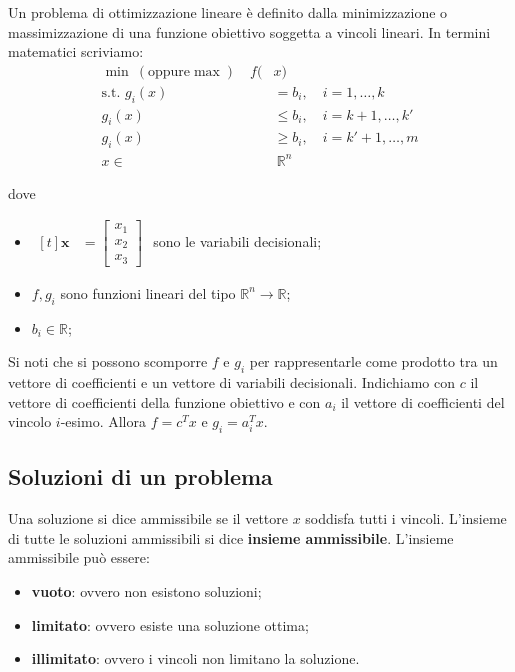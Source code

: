 \documentclass[12pt]{article}
\begin{document}
Un problema di ottimizzazione lineare è definito dalla minimizzazione o
massimizzazione di una funzione obiettivo soggetta a vincoli lineari. In termini
matematici scriviamo:
\begin{align*}
	\min \ (\text{oppure} \max) \quad f( & x)                                   \\
	\text{s.t. } g_i(x)                  & = b_i, \quad i = 1, \dots, k         \\
	g_i(x)                               & \leq b_i, \quad i = k + 1, \dots, k' \\
	g_i(x)                               & \geq b_i, \quad i = k' + 1, \dots, m \\
	x                    \in             & \ \mathbb{R}^n
\end{align*}

dove
\begin{itemize}
	\item $\begin{aligned}[t]
			      \mathbf{x} & = \begin{bmatrix}
				                     x_1 \\
				                     x_2 \\
				                     x_3
			                     \end{bmatrix}
		      \end{aligned}$
	      sono le variabili decisionali;
	\item $f, g_i$ sono funzioni lineari del tipo $\mathbb{R}^n \rightarrow
		      \mathbb{R}$;
	\item $b_i \in \mathbb{R}$;
\end{itemize}

Si noti che si possono scomporre $f$ e $g_i$ per rappresentarle come prodotto
tra un vettore di coefficienti e un vettore di variabili decisionali. Indichiamo
con $c$ il vettore di coefficienti della funzione obiettivo e con $a_i$ il
vettore di coefficienti del vincolo $i$-esimo. Allora $f = c^T x$ e $g_i = a_i^T
	x$.

\subsection{Soluzioni di un problema}

Una soluzione si dice ammissibile se il vettore $x$ soddisfa tutti i vincoli.
L'insieme di tutte le soluzioni ammissibili si dice
\textbf{insieme ammissibile}.
L'insieme ammissibile può essere:
\begin{itemize}
	\item \textbf{vuoto}: ovvero non esistono soluzioni;
	\item \textbf{limitato}: ovvero esiste una soluzione ottima;
	\item \textbf{illimitato}: ovvero i vincoli non limitano la soluzione.
\end{itemize}
\end{document}
